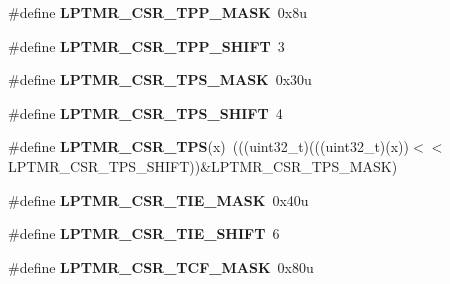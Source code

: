\begin{DoxyCompactItemize}
\#define {\bfseries L\+P\+T\+M\+R\+\_\+\+C\+S\+R\+\_\+\+T\+P\+P\+\_\+\+M\+A\+SK}~0x8u
\item 
\mbox{\label{group___l_p_t_m_r___register___masks_ga62be70d70bd4e88e26e5cc8437f6fd55}} 
\#define {\bfseries L\+P\+T\+M\+R\+\_\+\+C\+S\+R\+\_\+\+T\+P\+P\+\_\+\+S\+H\+I\+FT}~3
\item 
\mbox{\label{group___l_p_t_m_r___register___masks_ga3502ccff1cbdb70bb99b73c035ab1e19}} 
\#define {\bfseries L\+P\+T\+M\+R\+\_\+\+C\+S\+R\+\_\+\+T\+P\+S\+\_\+\+M\+A\+SK}~0x30u
\item 
\mbox{\label{group___l_p_t_m_r___register___masks_ga7759d842742bfedd91788d41ef12fb8d}} 
\#define {\bfseries L\+P\+T\+M\+R\+\_\+\+C\+S\+R\+\_\+\+T\+P\+S\+\_\+\+S\+H\+I\+FT}~4
\item 
\mbox{\label{group___l_p_t_m_r___register___masks_ga21ce2f3d05c087f7f46dcb9b7035e4f2}} 
\#define {\bfseries L\+P\+T\+M\+R\+\_\+\+C\+S\+R\+\_\+\+T\+PS}(x)~(((uint32\+\_\+t)(((uint32\+\_\+t)(x))$<$$<$L\+P\+T\+M\+R\+\_\+\+C\+S\+R\+\_\+\+T\+P\+S\+\_\+\+S\+H\+I\+FT))\&L\+P\+T\+M\+R\+\_\+\+C\+S\+R\+\_\+\+T\+P\+S\+\_\+\+M\+A\+SK)
\item 
\mbox{\label{group___l_p_t_m_r___register___masks_gabb726cb43d5f6ee38339048c69a5f086}} 
\#define {\bfseries L\+P\+T\+M\+R\+\_\+\+C\+S\+R\+\_\+\+T\+I\+E\+\_\+\+M\+A\+SK}~0x40u
\item 
\mbox{\label{group___l_p_t_m_r___register___masks_gaaedba0195b3abfcae6e8669f84f39d5d}} 
\#define {\bfseries L\+P\+T\+M\+R\+\_\+\+C\+S\+R\+\_\+\+T\+I\+E\+\_\+\+S\+H\+I\+FT}~6
\item 
\mbox{\label{group___l_p_t_m_r___register___masks_ga13b5dd6085ca2a8cf0f06550b7557b6b}} 
\#define {\bfseries L\+P\+T\+M\+R\+\_\+\+C\+S\+R\+\_\+\+T\+C\+F\+\_\+\+M\+A\+SK}~0x80u
\item 
\mbox{\label{group___l_p_t_m_r___register___masks_ga0ffa48fac670327deffc2e17ef1dea68}} 
$$
\end{DoxyCompactItemize}
